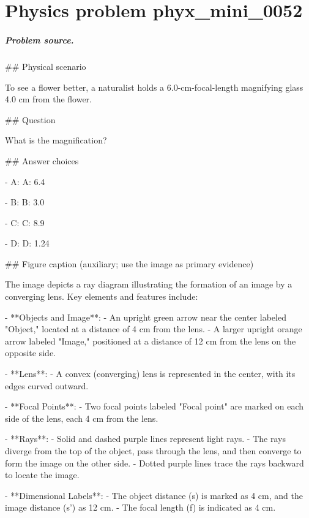 
\chapter{Physics problem phyx\_mini\_0052}
\label{ch:PhyXMiniProblems_problem_phyx_mini_0052}

\paragraph{Problem source.}
\#\# Physical scenario

To see a flower better, a naturalist holds a 6.0-cm-focal-length magnifying glass 4.0 cm from the flower.

\#\# Question

What is the magnification?

\#\# Answer choices

- A: A: 6.4

- B: B: 3.0

- C: C: 8.9

- D: D: 1.24

\#\# Figure caption (auxiliary; use the image as primary evidence)

The image depicts a ray diagram illustrating the formation of an image by a converging lens. Key elements and features include:

- **Objects and Image**: 
  - An upright green arrow near the center labeled "Object," located at a distance of 4 cm from the lens.
  - A larger upright orange arrow labeled "Image," positioned at a distance of 12 cm from the lens on the opposite side.

- **Lens**:
  - A convex (converging) lens is represented in the center, with its edges curved outward.

- **Focal Points**:
  - Two focal points labeled "Focal point" are marked on each side of the lens, each 4 cm from the lens.

- **Rays**:
  - Solid and dashed purple lines represent light rays. 
  - The rays diverge from the top of the object, pass through the lens, and then converge to form the image on the other side.
  - Dotted purple lines trace the rays backward to locate the image.

- **Dimensional Labels**:
  - The object distance (s) is marked as 4 cm, and the image distance (s') as 12 cm.
  - The focal length (f) is indicated as 4 cm.

